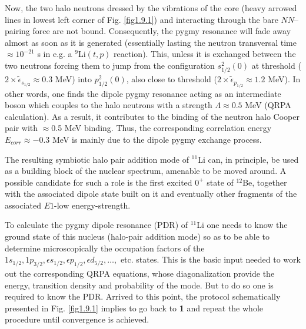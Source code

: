 Now, the two halo neutrons dressed by the vibrations of the core (heavy arrowed lines in lowest left corner of Fig. \ref{fig1.9.1}) and interacting through the bare $NN$--pairing force are not bound. Consequently, the pygmy resonance will fade away almost as soon as it is generated (essentially lasting the neutron transversal time $\approx 10^{-21}$ s in e.g. a $^9$Li$(t,p)$ reaction). This, unless it is exchanged between the two neutrons forcing them to jump from the configuration $s^{2}_{1/2}(0)$ at threshold ($2\times\tilde\epsilon_{s_{1/2}}\approx 0.3$ MeV) into  $p^2_{1/2}(0)$, also close to threshold     ($2\times\tilde\epsilon_{p_{1/2}}\approx 1.2$ MeV). In other words, one finds the dipole pygmy resonance acting as an intermediate boson which  couples to the halo neutrons with a  strength $\Lambda\approx 0.5$ MeV (QRPA calculation). As a result, it contributes to the binding of the neutron halo Cooper pair with $\approx$0.5 MeV binding. Thus, the corresponding correlation energy $E_{corr}\approx-0.3$ MeV is mainly due to the dipole pygmy exchange process.


 The resulting symbiotic halo pair addition mode of $^{11}$Li can, in principle, be used as a building block of the nuclear spectrum, amenable to  be moved around. A possible candidate for such a role is the first excited $0^+$ state of $^{12}$Be, together with the associated dipole state built on it and eventually other fragments of the associated $E1$-low energy-strength.


 To calculate the pygmy dipole  resonance (PDR) of $^{11}$Li one needs to know the ground state of this nucleus (halo-pair addition mode) so as to be able to determine microscopically the occupation factors of the $1s_{1/2},1p_{3/2},\epsilon s_{1/2},\epsilon p_{1/2},\epsilon d_{5/2},\dots,$ etc. states.  This is the basic input needed to work out the corresponding QRPA equations, whose diagonalization provide the energy, transition density and probability of the mode. But to do so one is required to know the PDR. Arrived to this point, the protocol schematically presented in Fig. \ref{fig1.9.1}  implies to  go back to \textbf{1} and repeat the whole procedure until   convergence is achieved. 

